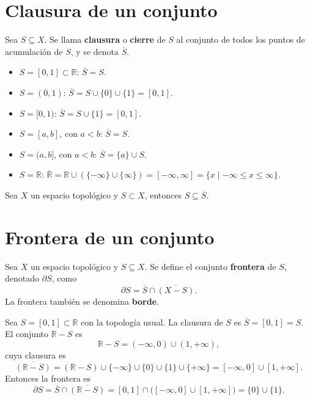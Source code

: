 \section{Clausura de un conjunto}

\begin{definicion}[Clausura]
Sea $S\subseteq X$. Se llama \textbf{clausura} o \textbf{cierre} de $S$ al
conjunto de todos los puntos de acumulación de $S$, y se denota
$\overline{S}$.
\end{definicion}

\begin{ejemplo}
\begin{itemize}
\item $S=[0,1]\subset\mathbb{R}$: $\overline{S}=S$.
\item $S=(0,1)$: $\overline{S} = S\cup\{0\}\cup\{1\} = [0,1]$.
\item $S=[0,1)$: $\overline{S} = S\cup\{1\} = [0,1]$.
\item $S=[a,b]$, con $a<b$: $\overline{S}=S$.
\item $S=(a,b]$, con $a<b$: $\overline{S} = \{a\}\cup S$.
\item $S=\mathbb{R}$: $\overline{\mathbb{R}} = \mathbb{R}\cup(\{-\infty\}
\cup\{\infty\}) = [-\infty,\infty] = \{x \mid -\infty\le x\le\infty\}$.
\end{itemize}
\end{ejemplo}

\begin{proposicionc}
Sea $X$ un espacio topológico y $S\subset X$, entonces $S\subseteq
\overline{S}$.
\end{proposicionc}

\section{Frontera de un conjunto}

\begin{definicion}[Frontera]
Sea $X$ un espacio topológico y $S\subseteq X$. Se define el conjunto
\textbf{frontera} de $S$, denotado $\partial S$, como
\[
\partial S = \overline{S} \cap \overline{(X-S)} .
\]
La frontera también se denomina \textbf{borde}.
\end{definicion}

\begin{ejemplo}
Sea $S=[0,1]\subset\mathbb{R}$ con la topología usual. La clausura de $S$
es $\overline{S}=[0,1]=S$. El conjunto $\mathbb{R}-S$ es
\[
\mathbb{R}-S = (-\infty,0)\cup(1,+\infty),
\]
cuya clausura es
\[
\overline{(\mathbb{R}-S)} = (\mathbb{R}-S)\cup\{-\infty\}\cup\{0\}\cup
\{1\}\cup\{+\infty\} = [-\infty,0]\cup[1,+\infty].
\]
Entonces la frontera es
\[
\partial S = \overline{S}\cap\overline{(\mathbb{R}-S)} = [0,1]\cap
\big([-\infty,0]\cup[1,+\infty]\big) = \{0\}\cup\{1\}.
\]
\end{ejemplo}

